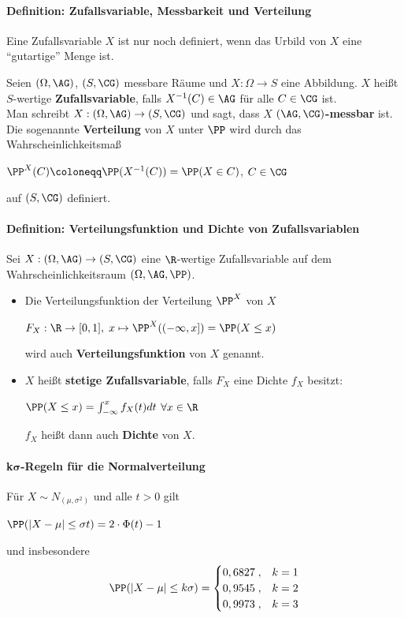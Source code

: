\paragraph{Definition: Zufallsvariable, Messbarkeit und Verteilung}
Eine Zufallsvariable $X$ ist nur noch definiert, wenn das Urbild von $X$ eine \enquote{gutartige} Menge ist.

Seien $(\Omega,\AG)$, $(S,\CG)$ messbare Räume und $X:\Omega\rightarrow S$ eine Abbildung.
$X$ heißt $S$-wertige \textbf{Zufallsvariable}, falls $X^{-1}(C)\in\AG$ für alle $C\in\CG$ ist.\\
Man schreibt $X:(\Omega,\AG)\rightarrow(S,\CG)$ und sagt, dass $X$ $(\AG,\CG)$\textbf{-messbar} ist.
Die sogenannte \textbf{Verteilung} von $X$ unter $\PP$ wird durch das Wahrscheinlichkeitsmaß
\begin{tightcenter}
	$\PP^X(C)\coloneqq\PP(X^{-1}(C))=\PP(X\in C)$, \qquad$C\in\CG$
\end{tightcenter}
auf $(S,\CG)$ definiert.

\paragraph{Definition: Verteilungsfunktion und Dichte von Zufallsvariablen}
Sei $X:(\Omega,\AG)\rightarrow(S,\CG)$ eine $\R$-wertige Zufallsvariable auf dem Wahrscheinlichkeitsraum $(\Omega,\AG,\PP)$.
\begin{itemize}
	\item Die Verteilungsfunktion der Verteilung $\PP^X$ von $X$
	\begin{tightcenter}
		$F_X:\R\rightarrow[0,1],\; x\mapsto\PP^X((-\infty,x])=\PP(X\leq x)$
	\end{tightcenter}
	wird auch \textbf{Verteilungsfunktion} von $X$ genannt.
	\item $X$ heißt \textbf{stetige Zufallsvariable}, falls $F_X$ eine Dichte $f_X$ besitzt:
	\begin{tightcenter}
		$\PP(X\leq x)=\int_{-\infty}^{x}f_X(t)dt$ \qquad$\forall x\in\R$
	\end{tightcenter}
	$f_X$ heißt dann auch \textbf{Dichte} von $X$.
\end{itemize}

\paragraph{k$\boldsymbol{\sigma}$-Regeln für die Normalverteilung}
Für $X\sim N_{(\mu,\sigma^2)}$ und alle $t>0$ gilt
\begin{tightcenter}
	$\PP(|X-\mu|\leq\sigma t)=2\cdot\Phi(t)-1$
\end{tightcenter}
und insbesondere
\[   
\PP(|X-\mu|\leq k\sigma)=
\begin{cases}
	0,6827\;, & k=1\\
	0,9545\;, & k=2\\
	0,9973\;, & k=3
\end{cases}
\]

